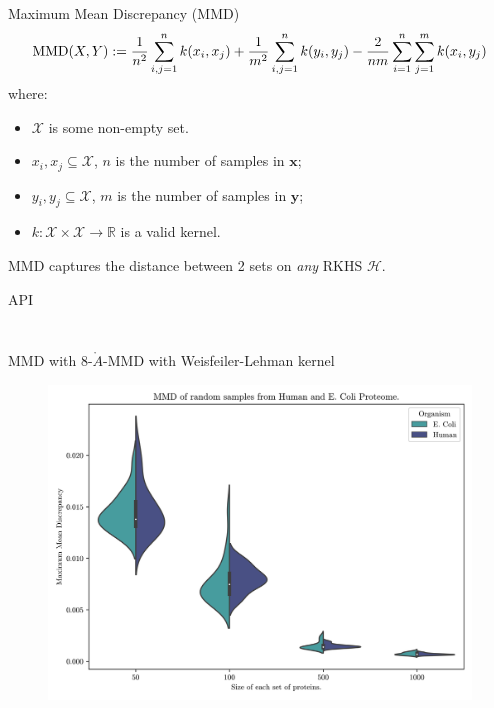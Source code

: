 \documentclass[aspectratio=169, 10pt, dvipsnames, handout]{beamer}
\begin{document}
\begin{frame}[fragile]{Maximum Mean Discrepancy (MMD)}
  \begin{equation*}
    \text{MMD}(X, Y) := {1\over n^2} \sum_{i,j=1}^{n}k(x_i, x_j) + {1\over m^2} \sum_{i,j=1}^{n}k(y_i, y_j) - {2\over nm} \sum_{i=1}^{n}\sum_{j=1}^{m}k(x_i, y_j)
  \end{equation*}
    where:
    \begin{itemize}
    \item $\mathcal{X}$ is some non-empty set.
    \item  $x_i, x_j \subseteq \mathcal{X}$, $n$ is the number of samples in $\mathbf{x}$;
    \item  $y_i, y_j \subseteq \mathcal{X}$, $m$ is the number of samples in $\mathbf{y}$;
    \item $k: \mathcal{X}\times\mathcal{X}\to\mathbb{R}$ is a valid kernel.
    \end{itemize}

    \small MMD captures the distance between 2 sets on \emph{any} RKHS $\mathcal{H}$.
  \end{frame}

{
  \begin{frame}[fragile]{API}
    \begin{minipage}{.45\textwidth}
      \inputminted[firstline=1, lastline=15]{python}{example_pipeline_with_noise.py}
    \end{minipage}
    \hfill
    \pause
    \begin{minipage}{.45\textwidth}
      \inputminted[firstline=17, lastline=26]{python}{example_pipeline_with_noise.py}
    \end{minipage}
  \end{frame}

  \begin{frame}[fragile]{MMD with 8-$\mathring{A}$-MMD with Weisfeiler-Lehman kernel}
    \begin{figure}
      \centering
      \includegraphics[height=\textheight]{./figures/mmd_variance_baseline.png}
    \end{figure}
  \end{frame}
}
\end{document}
